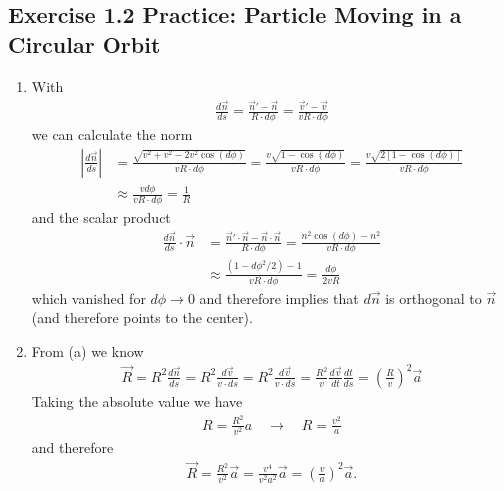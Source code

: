 \documentclass[10pt,a4paper]{book}
\theoremstyle{definition}
\begin{document}
\subsection{Exercise 1.2 Practice: Particle Moving in a Circular Orbit}
\begin{enumerate}[label=(\alph*)]
\item With
\begin{align}
    \frac{d\vec{n}}{ds}
    =\frac{\vec{n}'-\vec{n}}{R\cdot d\phi}=\frac{\vec{v}'-\vec{v}}{vR\cdot d\phi}
\end{align}
we can calculate the norm
\begin{align}
    \left|\frac{d\vec{n}}{ds}\right|
    &=\frac{\sqrt{v^2+v^2-2v^2\cos(d\phi)}}{vR\cdot d\phi}
    =\frac{v\sqrt{1-\cos(d\phi)}}{vR\cdot d\phi}
    = \frac{v\sqrt{2[1-\cos(d\phi)]}}{vR\cdot d\phi}\\
    &\approx\frac{vd\phi}{vR\cdot d\phi}=\frac{1}{R}
\end{align}
and the scalar product
\begin{align}
    \frac{d\vec{n}}{ds}\cdot\vec{n}
    &=\frac{\vec{n}'\cdot\vec{n}-\vec{n}\cdot\vec{n}}{R\cdot d\phi}=\frac{n^2\cos(d\phi)-n^2}{vR\cdot d\phi}\\
    &\approx \frac{(1-d\phi^2/2)-1}{vR\cdot d\phi}=\frac{d\phi}{2vR}
\end{align}
which vanished for $d\phi\rightarrow0$ and therefore implies that $d\vec{n}$ is orthogonal to $\vec{n}$ (and therefore points to the center).
\item From (a) we know
\begin{align}
    \vec{R}=R^2\frac{d\vec{n}}{ds}
    =R^2\frac{d\vec{v}}{v\cdot ds}
    =R^2\frac{d\vec{v}}{v\cdot ds}
    =\frac{R^2}{v}\frac{d\vec{v}}{dt}\frac{dt}{ds}
    =\left(\frac{R}{v}\right)^2\vec{a}
\end{align}
Taking the absolute value we have
\begin{align}
    R=\frac{R^2}{v^2}a\quad\rightarrow\quad R=\frac{v^2}{a}
\end{align}
and therefore
\begin{align}
    \vec{R}=\frac{R^2}{v^2}\vec{a}=\frac{v^4}{v^2 a^2}\vec{a}=\left(\frac{v}{a}\right)^2\vec{a}.
\end{align}
\end{enumerate}
\end{document}
